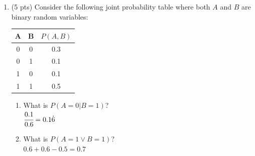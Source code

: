 \documentclass[a4paper]{article}
\theoremstyle{definition}
\newenvironment{soln}{
	\leavevmode\color{blue}\ignorespaces
}{}
\begin{document}
\begin{enumerate}
		\item 	(5 pts) Consider the following joint probability                 
                table where both $A$ and $B$ are binary random variables: 
		\begin{table}[htb]
			\centering
			\begin{tabular}{ccc}\hline
				A & B & $P(A, B)$  \\\hline
				0 & 0 & 0.3 \\
				0 & 1 & 0.1 \\
				1 & 0 & 0.1 \\
				1 & 1 & 0.5 \\\hline
			\end{tabular}
		\end{table}
		\begin{enumerate}
			\item 	What is $P(A = 0 | B = 1)$?\\
			 \begin{soln}  $ \cfrac{0.1}{0.6} = 0.1\dot{6}$ \end{soln}
			 
			\item 	What is $P(A = 1 \vee B = 1 )$?\\
		     \begin{soln}  $ 0.6 + 0.6 - 0.5 = 0.7 $ \end{soln}
		\end{enumerate}
	\end{enumerate}
	
	
\end{document}
